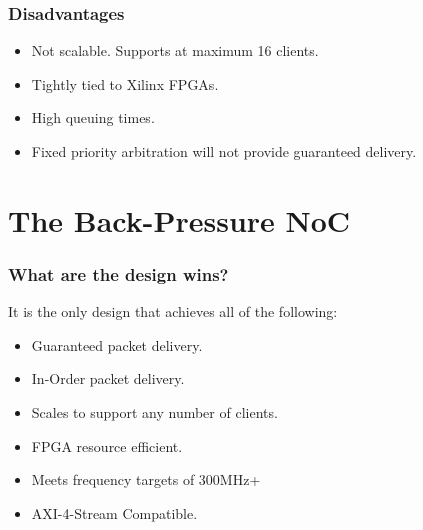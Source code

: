 \documentclass{beamer}
\begin{document}
	    \begin{frame}\frametitle{Disadvantages}
	    \pause
	    \begin{itemize}
	        \item Not scalable. Supports at maximum 16 clients.
	        \pause
	        \item Tightly tied to Xilinx FPGAs.
	        \pause
	        \item High queuing times.
	        \pause
	        \item Fixed priority arbitration will not provide guaranteed delivery.
        \end{itemize}
	    \end{frame}	
	
	\section{The Back-Pressure NoC}
        \begin{frame}
        \frametitle{What are the design wins?}
           \pause
           It is the only design that achieves all of the following:
           \pause
           \begin{itemize}
               \item Guaranteed packet delivery.
               \pause 
               \item In-Order packet delivery.
               \pause
               \item Scales to support any number of clients.
               \pause
               \item FPGA resource efficient.
               \pause
               \item Meets frequency targets of 300MHz+
               \pause
               \item AXI-4-Stream Compatible.
           \end{itemize}
        \end{frame}
        
\end{document}
